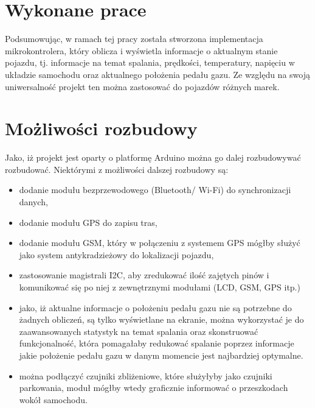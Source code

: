 \section{Wykonane prace}
Podsumowując, w ramach tej pracy została stworzona implementacja mikrokontrolera, który oblicza i wyświetla informacje o aktualnym stanie pojazdu, tj. informacje na temat spalania, prędkości, temperatury, napięciu w układzie samochodu oraz aktualnego położenia pedału gazu. Ze względu na swoją uniwersalność projekt ten można zastosować do pojazdów różnych marek.
\section{Możliwości rozbudowy}
Jako, iż projekt jest oparty o platformę Arduino można go dalej rozbudowywać rozbudować. Niektórymi z możliwości dalszej rozbudowy są:
\begin{itemize}
\item dodanie modułu bezprzewodowego (Bluetooth/ Wi-Fi) do synchronizacji danych,
\item dodanie modułu GPS do zapisu tras,
\item dodanie modułu GSM, który w połączeniu z systemem GPS mógłby służyć jako system antykradzieżowy do lokalizacji pojazdu,
\item zastosowanie magistrali I2C, aby zredukować ilość zajętych pinów i komunikować się po niej z zewnętrznymi modułami (LCD, GSM, GPS itp.)
\item jako, iż aktualne informacje o położeniu pedału gazu nie są potrzebne do żadnych obliczeń, są tylko wyświetlane na ekranie, można wykorzystać je do zaawansowanych statystyk na temat spalania oraz skonstruować funkcjonalność, która pomagałaby redukować spalanie poprzez informacje jakie położenie pedału gazu w danym momencie jest najbardziej optymalne.
\item można podłączyć czujniki zbliżeniowe, które służyłyby jako czujniki parkowania, moduł mógłby wtedy graficznie informować o przeszkodach wokół samochodu.
\end{itemize}
